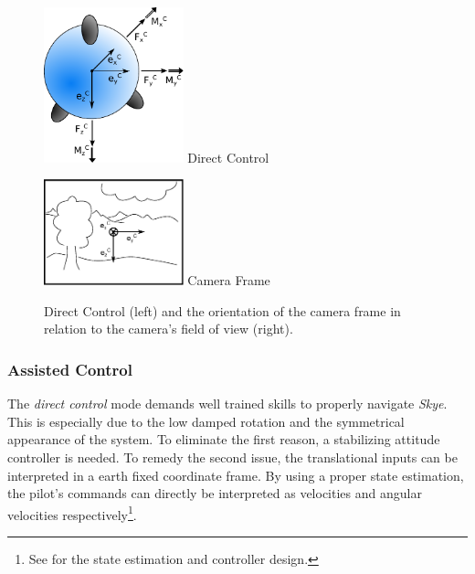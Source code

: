 \begin{figure}[H]		
	\small{
		\begin{center}
			\parbox{0.36\textwidth}{\centering \includegraphics[width=0.36\textwidth]{DC}
			 Direct Control}
			\hspace{0.1\textwidth}			
			\parbox{0.36\textwidth}{\centering \includegraphics[width=0.36\textwidth]{CameraFrame}
			Camera Frame}
	\caption[Assisted Control]{Direct Control (left) and the orientation of the camera frame in relation to the camera's field of view (right).}
		\label{fig:direct_control}
		\end{center}
	}			
	\vspace{4.5mm}
\end{figure}


\subsubsection{Assisted Control} 
The \textit{direct control} mode demands well trained skills to properly navigate \textit{Skye}. This is especially due to the low damped rotation \cite{weichart} and the symmetrical appearance of the system. To eliminate the first reason, a stabilizing attitude controller is needed. To remedy the second issue, the translational inputs can be interpreted in a earth fixed coordinate frame. By using a proper state estimation, the pilot's commands can directly be interpreted as velocities and angular velocities respectively\footnote{See \cite{meiermueri} for the state estimation and controller design.}.

